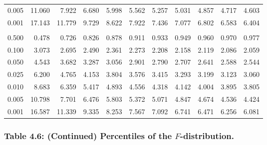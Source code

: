 \documentclass[
]{article}
\begin{document}
\begin{longtable}[t]{lrrrrrrrrrr}
\hspace{1em}0.005 & 11.060 & 7.922 & 6.680 & 5.998 & 5.562 & 5.257 & 5.031 & 4.857 & 4.717 & 4.603\\
\hspace{1em}0.001 & 17.143 & 11.779 & 9.729 & 8.622 & 7.922 & 7.436 & 7.077 & 6.802 & 6.583 & 6.404\\
\addlinespace[0.3em]
\multicolumn{11}{l}{\textbf{$k_2=15$}}\\
\hspace{1em}0.500 & 0.478 & 0.726 & 0.826 & 0.878 & 0.911 & 0.933 & 0.949 & 0.960 & 0.970 & 0.977\\
\hspace{1em}0.100 & 3.073 & 2.695 & 2.490 & 2.361 & 2.273 & 2.208 & 2.158 & 2.119 & 2.086 & 2.059\\
\hspace{1em}0.050 & 4.543 & 3.682 & 3.287 & 3.056 & 2.901 & 2.790 & 2.707 & 2.641 & 2.588 & 2.544\\
\hspace{1em}0.025 & 6.200 & 4.765 & 4.153 & 3.804 & 3.576 & 3.415 & 3.293 & 3.199 & 3.123 & 3.060\\
\hspace{1em}0.010 & 8.683 & 6.359 & 5.417 & 4.893 & 4.556 & 4.318 & 4.142 & 4.004 & 3.895 & 3.805\\
\hspace{1em}0.005 & 10.798 & 7.701 & 6.476 & 5.803 & 5.372 & 5.071 & 4.847 & 4.674 & 4.536 & 4.424\\
\hspace{1em}0.001 & 16.587 & 11.339 & 9.335 & 8.253 & 7.567 & 7.092 & 6.741 & 6.471 & 6.256 & 6.081\\
\bottomrule
\end{longtable}

\newpage

\subsubsection{\texorpdfstring{Table 4.6: (Continued) Percentiles of the
\(F\)-distribution.}{Table 4.6: (Continued) Percentiles of the F-distribution.}}\label{table-4.6-continued-percentiles-of-the-f-distribution.}
\end{document}
